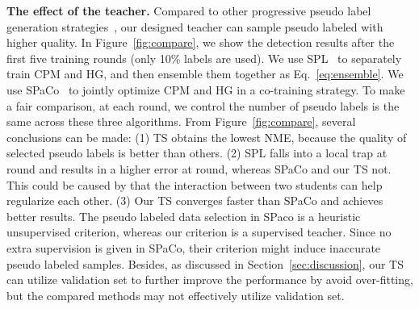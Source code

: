 \documentclass[10pt,twocolumn,letterpaper]{article}
\def\Figref#1{Figure~\ref{#1}}
\def\Secref#1{Section~\ref{#1}}
\def\Eqref#1{{Eq.~\eqref{#1}}}
\def\NAME{{{TS}}} \def\LLB{\textcolor{red}}
\begin{document}
\textbf{The effect of the teacher.}
Compared to other progressive pseudo label generation strategies~\cite{kumar2010self,jiang2015self,ma2017self}, our designed teacher can sample pseudo labeled with higher quality.
In \Figref{fig:compare}, we show the detection results after the first five training rounds (only 10\% labels are used).
We use SPL~\cite{kumar2010self,jiang2015self} to separately train CPM and HG, and then ensemble them together as \Eqref{eq:ensemble}.
We use SPaCo~\cite{ma2017self} to jointly optimize CPM and HG in a co-training strategy.
To make a fair comparison, at each round, we control the number of pseudo labels is the same across these three algorithms.
From \Figref{fig:compare}, several conclusions can be made:
(1) {\NAME} obtains the lowest NME, because the quality of selected pseudo labels is better than others.
(2) SPL falls into a local trap at round and results in a higher error at round, whereas SPaCo and our {\NAME} not. This could be caused by that the interaction between two students can help regularize each other.
(3) Our {\NAME} converges faster than SPaCo and achieves better results. The pseudo labeled data selection in SPaco is a heuristic unsupervised criterion, whereas our criterion is a supervised teacher. Since no extra supervision is given in SPaCo, their criterion might induce inaccurate pseudo labeled samples.
Besides, as discussed in \Secref{sec:discussion}, our {\NAME} can utilize validation set to further improve the performance by avoid over-fitting, but the compared methods may not effectively utilize validation set.
\end{document}
